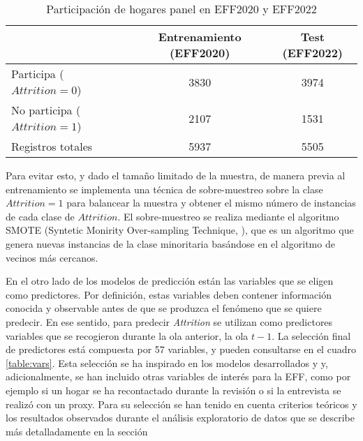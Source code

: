 \begin{table}[htbp]
\begin{tabular}{lcc}
 & \textbf{Entrenamiento (EFF2020)} & \textbf{Test (EFF2022)} \\ \hline
Participa ($Attrition = 0$) & 3830 & 3974 \\
No participa ($Attrition = 1$) & 2107 & 1531 \\ \hline
Registros totales & 5937 & 5505
\end{tabular}
\caption{Participación de hogares panel en EFF2020 y EFF2022}
\label{table:attrition}
\end{table}

Para evitar esto, y dado el tamaño limitado de la muestra, de manera previa al entrenamiento se implementa una técnica de sobre-muestreo sobre la clase $Attrition=1$ para balancear la muestra y obtener el mismo número de instancias de cada clase de $Attrition$. El sobre-muestreo se realiza mediante el algoritmo SMOTE (Syntetic Monirity Over-sampling Technique, \cite{chawla2002smote}), que es un algoritmo que genera nuevas instancias de la clase minoritaria basándose en el algoritmo de vecinos más cercanos.

En el otro lado de los modelos de predicción están las variables que se eligen como predictores. Por definición, estas variables deben contener información conocida y observable antes de que se produzca el fenómeno que se quiere predecir. En ese sentido, para predecir \textit{Attrition} se utilizan como predictores variables que se recogieron durante la ola anterior, la ola $t-1$. La selección final de predictores está compuesta por 57 variables, y pueden consultarse en el cuadro \ref{table:vars}. Esta selección se ha inspirado en los modelos desarrollados \cite{kern2021predicting} y \cite{beste2023case} y, adicionalmente, se han incluido otras variables de interés para la EFF, como por ejemplo si un hogar se ha recontactado durante la revisión o si la entrevista se realizó con un proxy. Para su selección se han tenido en cuenta criterios teóricos y los resultados observados durante el análisis exploratorio de datos que se describe más detalladamente en la sección 

